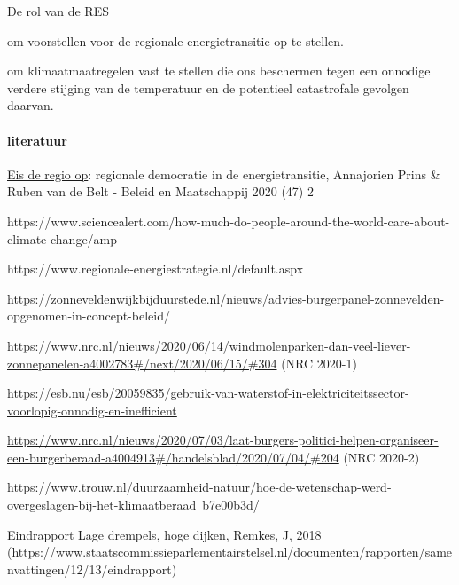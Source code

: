 \begin{voorstel}{De rol van de RES}
\begin{multicols*}{2}
\begin{overwegingen}


\end{overwegingen}

\begin{aanbevelingen}
 om voorstellen voor de regionale energietransitie op te stellen.

 om klimaatmaatregelen vast te stellen die ons beschermen tegen een onnodige verdere stijging van de temperatuur en de potentieel catastrofale gevolgen daarvan.

\end{aanbevelingen}

\paragraph{literatuur}

\href{https://energievoordrenthe.nl/toolkit/volksvertegenwoordigers/HandlerDownloadFiles.ashx?idnv=1688984}{Eis de regio op}: regionale democratie in de energietransitie, Annajorien Prins \& Ruben van de Belt - Beleid en Maatschappij 2020 (47) 2

https://www.sciencealert.com/how-much-do-people-around-the-world-care-about-climate-change/amp

https://www.regionale-energiestrategie.nl/default.aspx

https://zonneveldenwijkbijduurstede.nl/nieuws/advies-burgerpanel-zonnevelden-opgenomen-in-concept-beleid/

\url{https://www.nrc.nl/nieuws/2020/06/14/windmolenparken-dan-veel-liever-zonnepanelen-a4002783#/next/2020/06/15/#304} (NRC 2020-1)

\url{https://esb.nu/esb/20059835/gebruik-van-waterstof-in-elektriciteitssector-voorlopig-onnodig-en-inefficient}

\url{https://www.nrc.nl/nieuws/2020/07/03/laat-burgers-politici-helpen-organiseer-een-burgerberaad-a4004913#/handelsblad/2020/07/04/#204} (NRC 2020-2)

https://www.trouw.nl/duurzaamheid-natuur/hoe-de-wetenschap-werd-overgeslagen-bij-het-klimaatberaad~b7e00b3d/

Eindrapport Lage drempels, hoge dijken, Remkes, J, 2018 (https://www.staatscommissieparlementairstelsel.nl/documenten/rapporten/samenvattingen/12/13/eindrapport)

\end{multicols*}

\end{voorstel}
